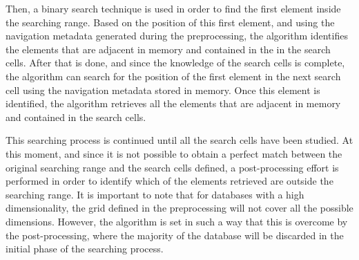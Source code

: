 \documentclass[preprint,12pt]{elsarticle}
\begin{document}
Then, a binary search technique is used in order to find the first element inside the searching range. Based on the position of this first element, and using the navigation metadata generated during the preprocessing, the algorithm identifies the elements that are adjacent in memory and contained in the in the search cells. After that is done, and since the knowledge of the search cells is complete, the algorithm can search for the position of the first element in the next search cell using the navigation metadata stored in memory. Once this element is identified, the algorithm retrieves all the elements that are adjacent in memory and contained in the search cells.

This searching process is continued until all the search cells have been studied. At this moment, and since it is not possible to obtain a perfect match between the original searching range and the search cells defined, a post-processing effort is performed in order to identify which of the elements retrieved are outside the searching range. It is important to note that for databases with a high dimensionality, the grid defined in the preprocessing will not cover all the possible dimensions. However, the algorithm is set in such a way that this is overcome by the post-processing, where the majority of the database will be discarded in the initial phase of the searching process.
\end{document}
